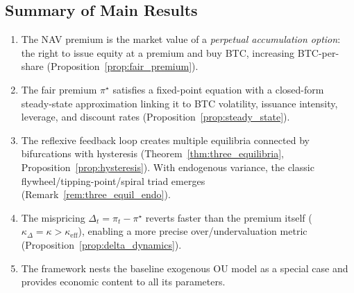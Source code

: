 \subsection{Summary of Main Results}
\label{sec:theory_summary}

\begin{enumerate}
  \item The NAV premium is the market value of a \emph{perpetual accumulation
    option}: the right to issue equity at a premium and buy BTC, increasing
    BTC-per-share (Proposition~\ref{prop:fair_premium}).

  \item The fair premium $\pi^\star$ satisfies a fixed-point equation with a
    closed-form steady-state approximation linking it to BTC volatility,
    issuance intensity, leverage, and discount rates
    (Proposition~\ref{prop:steady_state}).

  \item The reflexive feedback loop creates multiple equilibria connected by
    bifurcations with hysteresis (Theorem~\ref{thm:three_equilibria},
    Proposition~\ref{prop:hysteresis}).  With endogenous variance, the
    classic flywheel/tipping-point/spiral triad emerges
    (Remark~\ref{rem:three_equil_endo}).

  \item The mispricing $\Delta_t = \pi_t - \pi^\star$ reverts faster than the
    premium itself ($\kappa_\Delta = \kappa > \kappa_{\mathrm{eff}}$), enabling
    a more precise over/undervaluation metric
    (Proposition~\ref{prop:delta_dynamics}).

  \item The framework nests the baseline exogenous OU model as a special case
    and provides economic content to all its parameters.
\end{enumerate}
